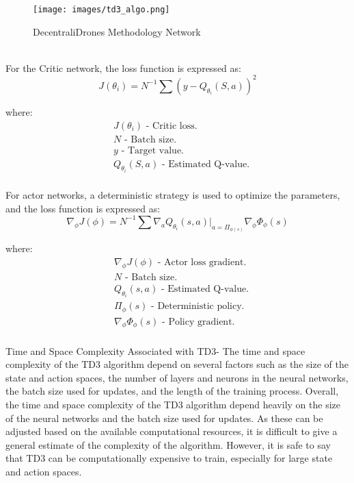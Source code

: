 \documentclass[preprint,12pt]{elsarticle}
\begin{document}
\begin{figure}[!htbp]
    \centering
    \texttt{[image: images/td3\_algo.png]}
    \caption{DecentraliDrones Methodology Network}
\end{figure}\\
For the Critic network, the loss function is expressed as:
\begin{equation}
\label{eq:first}
J(\theta_i) = N^{-1}\sum(y - Q_{\theta_i}(S,a))^2
\end{equation}

where:\\
\begin{align*}
&J(\theta_i) \text{ - Critic loss.} \\
&N \text{ - Batch size.} \\
&y \text{ - Target value.} \\
&Q_{\theta_i}(S,a) \text{ - Estimated Q-value.} \\
\end{align*}

For actor networks, a deterministic strategy is used to optimize the parameters, and the loss function is expressed as:
\begin{equation}
\label{eq:second}
{\nabla_\phi}{J(\phi)}=N^{-1}\sum\nabla_{a}Q_{\theta_i}(s,a)|_{a=\Pi_{\phi(s)}}\nabla_{\phi}\Phi_\phi(s)
\end{equation}

where:\\
\begin{align*}
&\nabla_\phi J(\phi) \text{ - Actor loss gradient.} \\
&N \text{ - Batch size.} \\
&Q_{\theta_i}(s,a) \text{ - Estimated Q-value.} \\
&\Pi_\phi(s) \text{ - Deterministic policy.} \\
&\nabla_\phi\Phi_\phi(s) \text{ - Policy gradient.} \\
\end{align*}



Time and Space Complexity Associated with TD3-
The time and space complexity of the TD3 algorithm depend on several factors such as the size of the state and action spaces, the number of layers and neurons in the neural networks, the batch size used for updates, and the length of the training process. 
Overall, the time and space complexity of the TD3 algorithm depend heavily on the size of the neural networks and the batch size used for updates. As these can be adjusted based on the available computational resources, it is difficult to give a general estimate of the complexity of the algorithm. However, it is safe to say that TD3 can be computationally expensive to train, especially for large state and action spaces. \\
\end{document}
